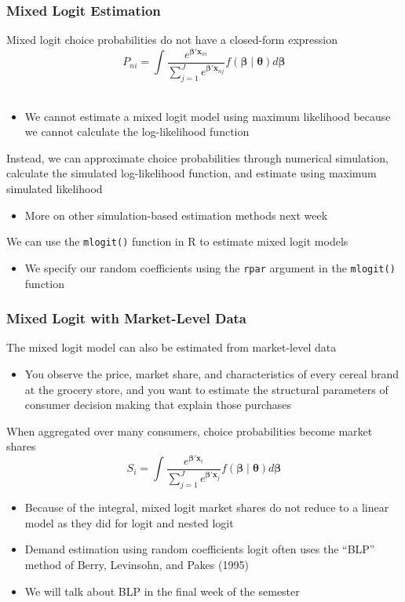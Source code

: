 \documentclass{beamer}
\begin{document}
\begin{frame}\frametitle{Mixed Logit Estimation}
    Mixed logit choice probabilities do not have a closed-form expression
    $$P_{ni} = \int \frac{e^{\bm{\beta}' \bm{x}_{ni}}}{\sum_{j = 1}^J e^{\bm{\beta}' \bm{x}_{nj}}} f(\bm{\beta} \mid \bm{\theta}) d \bm{\beta}$$ \\
    \begin{itemize}
        \item We cannot estimate a mixed logit model using maximum likelihood because we cannot calculate the log-likelihood function
    \end{itemize}
    \vspace{2ex}
    Instead, we can approximate choice probabilities through numerical simulation, calculate the simulated log-likelihood function, and estimate using maximum simulated likelihood 
    \begin{itemize}
        \item More on other simulation-based estimation methods next week
    \end{itemize}
    \vspace{2ex}
    We can use the \texttt{mlogit()} function in R to estimate mixed logit models
    \begin{itemize}
        \item We specify our random coefficients using the \texttt{rpar} argument in the \texttt{mlogit()} function
    \end{itemize}
\end{frame}

\begin{frame}\frametitle{Mixed Logit with Market-Level Data}
    The mixed logit model can also be estimated from market-level data
    \begin{itemize}
        \item You observe the price, market share, and characteristics of every cereal brand at the grocery store, and you want to estimate the structural parameters of consumer decision making that explain those purchases
    \end{itemize}
    \vspace{2ex}
    When aggregated over many consumers, choice probabilities become market shares
    $$S_i = \int \frac{e^{\bm{\beta}' \bm{x}_i}}{\sum_{j = 1}^J e^{\bm{\beta}' \bm{x}_j}} f(\bm{\beta} \mid \bm{\theta}) d \bm{\beta}$$
    \begin{itemize}
        \item Because of the integral, mixed logit market shares do not reduce to a linear model as they did for logit and nested logit
        \item Demand estimation using random coefficients logit often uses the ``BLP'' method of Berry, Levinsohn, and Pakes (1995)
        \item We will talk about BLP in the final week of the semester
    \end{itemize}
\end{frame}
\end{document}
